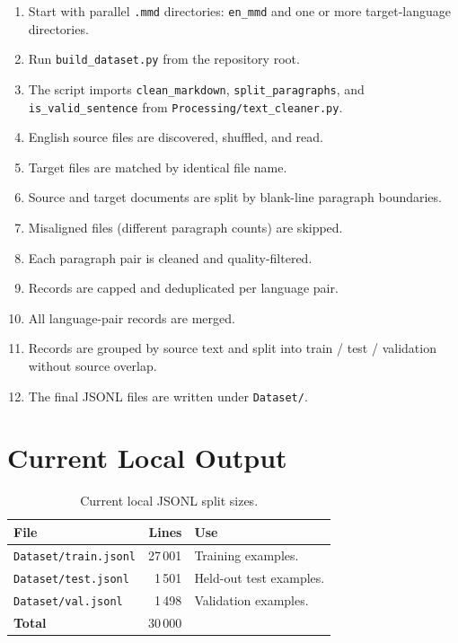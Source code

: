 \documentclass[12pt,a4paper]{article}
\begin{document}
\begin{enumerate}
  \item Start with parallel \texttt{.mmd} directories: \texttt{en\_mmd} and one or more target-language directories.
  \item Run \texttt{build\_dataset.py} from the repository root.
  \item The script imports \texttt{clean\_markdown}, \texttt{split\_paragraphs}, and \texttt{is\_valid\_sentence} from \texttt{Processing/text\_cleaner.py}.
  \item English source files are discovered, shuffled, and read.
  \item Target files are matched by identical file name.
  \item Source and target documents are split by blank-line paragraph boundaries.
  \item Misaligned files (different paragraph counts) are skipped.
  \item Each paragraph pair is cleaned and quality-filtered.
  \item Records are capped and deduplicated per language pair.
  \item All language-pair records are merged.
  \item Records are grouped by source text and split into train / test / validation without source overlap.
  \item The final JSONL files are written under \texttt{Dataset/}.
\end{enumerate}

\section{Current Local Output}

\begin{table}[H]
\centering
\caption{Current local JSONL split sizes.}
\label{tab:local-output}
\renewcommand{\arraystretch}{1.25}
\begin{tabular}{lrl}
\toprule
\textbf{File} & \textbf{Lines} & \textbf{Use} \\
\midrule
\texttt{Dataset/train.jsonl} & 27\,001 & Training examples. \\
\texttt{Dataset/test.jsonl}  &  1\,501 & Held-out test examples. \\
\texttt{Dataset/val.jsonl}   &  1\,498 & Validation examples. \\
\midrule
\textbf{Total}               & 30\,000 & \\
\bottomrule
\end{tabular}
\end{table}
\end{document}
